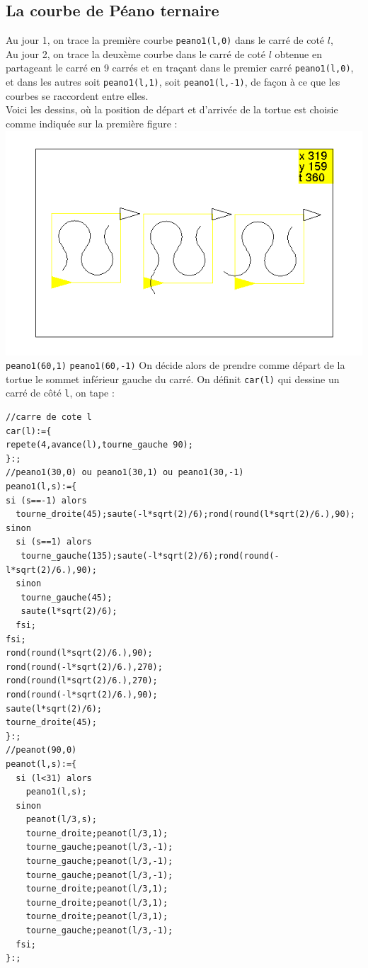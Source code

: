 \documentclass[a4paper,11pt]{book}
\begin{document}
\subsection{La courbe de P\'eano ternaire}
Au jour 1, on trace la premi\`ere courbe {\tt peano1(l,0)} dans le carr\'e de 
cot\'e $l$,\\
Au jour 2, on trace la deux\`eme courbe dans le carr\'e de cot\'e $l$
obtenue en partageant le carr\'e en 9 carr\'es et en tra\c{c}ant dans le premier carr\'e {\tt peano1(l,0)}, et dans les autres soit  
{\tt peano1(l,1)}, soit  {\tt peano1(l,-1)}, de fa\c{c}on \`a ce que les 
courbes se raccordent entre elles.\\
Voici les dessins, o\`u la position de d\'epart et d'arriv\'ee de la tortue est
 choisie comme indiqu\'ee sur la premi\`ere figure :\\
%
\includegraphics[width=\textwidth]{tortpeanot}\\
\hspace*{0.5cm}{\tt peano1(60,0)} {\tt peano1(60,1)} {\tt peano1(60,-1)}
On d\'ecide alors de prendre comme d\'epart de la tortue le 
sommet inf\'erieur gauche du carr\'e. On d\'efinit {\tt car(l)} qui dessine un 
carr\'e de c\^ot\'e {\tt l}, on tape :
\begin{verbatim}
//carre de cote l
car(l):={
repete(4,avance(l),tourne_gauche 90);
}:;
//peano1(30,0) ou peano1(30,1) ou peano1(30,-1)
peano1(l,s):={
si (s==-1) alors 
  tourne_droite(45);saute(-l*sqrt(2)/6);rond(round(l*sqrt(2)/6.),90);
sinon 
  si (s==1) alors
   tourne_gauche(135);saute(-l*sqrt(2)/6);rond(round(-l*sqrt(2)/6.),90);
  sinon
   tourne_gauche(45);
   saute(l*sqrt(2)/6);
  fsi;
fsi;
rond(round(l*sqrt(2)/6.),90);
rond(round(-l*sqrt(2)/6.),270);
rond(round(l*sqrt(2)/6.),270);
rond(round(-l*sqrt(2)/6.),90);
saute(l*sqrt(2)/6);
tourne_droite(45);
}:;
//peanot(90,0)
peanot(l,s):={
  si (l<31) alors 
    peano1(l,s);
  sinon
    peanot(l/3,s);
    tourne_droite;peanot(l/3,1);
    tourne_gauche;peanot(l/3,-1);
    tourne_gauche;peanot(l/3,-1);
    tourne_gauche;peanot(l/3,-1);
    tourne_droite;peanot(l/3,1);
    tourne_droite;peanot(l/3,1);
    tourne_droite;peanot(l/3,1);
    tourne_gauche;peanot(l/3,-1);
  fsi;
}:;
\end{verbatim}
\end{document}
